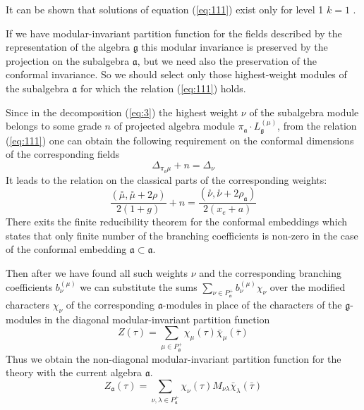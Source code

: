 \documentclass[a4paper,12pt]{article}
\theoremstyle{definition} \newtheorem{Def}{Definition}
\begin{document}
It can be shown that solutions of equation (\ref{eq:111}) exist only
for level 1 $k=1$ \cite{difrancesco1997cft}.

If we have modular-invariant partition function for the fields described by the representation of the algebra $\mathfrak{g}$ this modular invariance is preserved by the projection on the subalgebra $\mathfrak{a}$, but we need also the preservation of the conformal invariance. So we should select only those highest-weight modules of the subalgebra $\mathfrak{a}$ for which the relation (\ref{eq:111}) holds.

Since in the decomposition (\ref{eq:3}) the highest weight $\nu$ of the subalgebra module belongs to some grade $n$ of projected algebra module $\pi_{\mathfrak{a}}\cdot L^{(\mu)}_{\mathfrak{g}}$, from the relation (\ref{eq:111}) one can obtain the following requirement on the conformal dimensions of the corresponding fields
\begin{equation}
  \label{eq:32}
   \Delta_{\pi_{\mathfrak{a}}\mu}+n=\Delta_{\nu}
\end{equation}
It leads to the relation on the classical parts of the corresponding weights:
\begin{equation}
  \label{eq:33}
  \frac{(\overset{\circ }{\mu},\overset{\circ }{\mu}+2\rho)}{2(1+g)}+n=\frac{(\overset{\circ }{\nu},\overset{\circ }{\nu}+2\rho_{\mathfrak{a}})}{2(x_e+a)}
\end{equation}
There exits the finite reducibility theorem for the conformal embeddings which states that only finite number of the branching coefficients is non-zero in the case of the conformal embedding $\mathfrak{a}\subset\mathfrak{a}$.

Then after we have found all such weights $\nu$ and the corresponding branching coefficients $b^{(\mu)}_{\nu}$ we can substitute the sums $\sum_{\nu \in P^{+}_{\mathfrak{a}}}b^{(\mu)}_{\nu} \chi_{\nu}$ over the modified characters $\chi_{\nu}$ of the corresponding $\mathfrak{a}$-modules in place of the characters of the $\mathfrak{g}$-modules in the diagonal modular-invariant partition function
\begin{equation}
  \label{eq:34}
   Z(\tau)=\sum_{ \mu\in P^{+}_{\mathfrak{g}}} \chi_{\mu}(\tau)\bar \chi_{\mu}(\bar \tau)
\end{equation}
Thus we obtain the non-diagonal modular-invariant  partition function for the theory with the current algebra $\mathfrak{a}$.
\begin{equation}
  \label{eq:36}
   Z_{\mathfrak{a}}(\tau)=\sum_{ \nu,\lambda\in P^{+}_{\mathfrak{a}}} \chi_{\nu}(\tau)M_{\nu\lambda}\bar \chi_{\lambda}(\bar \tau)
\end{equation}
\end{document}
